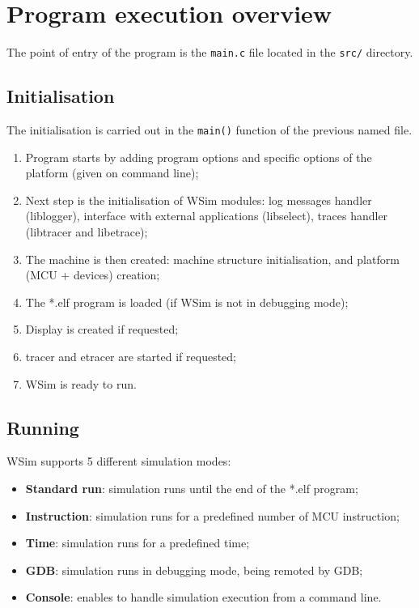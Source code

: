 \documentclass[a4paper,10pt]{report}
\begin{document}
\chapter{Program execution overview}
\label{prog-exec}

The point of entry of the program is the \verb$main.c$ file located in the \verb$src/$ directory.

\section{Initialisation}
The initialisation is carried out in the \verb$main()$ function of the previous named file.
\begin{enumerate}
  \item Program starts by adding program options and specific options of the platform (given on command line);      
  \item Next step is the initialisation of WSim modules: log messages handler (liblogger), interface with external applications (libselect), traces handler (libtracer and libetrace);
  \item The machine is then created: machine structure initialisation, and platform (MCU + devices) creation;
  \item The *.elf program is loaded (if WSim is not in debugging mode);
  \item Display is created if requested;
  \item tracer and etracer are started if requested;
  \item WSim is ready to run.
\end{enumerate}

\section{Running}
WSim supports 5 different simulation modes:
\begin{itemize}
  \item \textbf{Standard run}: simulation runs until the end of the *.elf program;
  \item \textbf{Instruction}: simulation runs for a predefined number of MCU instruction;
  \item \textbf{Time}: simulation runs for a predefined time;
  \item \textbf{GDB}: simulation runs in debugging mode, being remoted by GDB;
  \item \textbf{Console}: enables to handle simulation execution from a command line.
\end{itemize}
\end{document}

